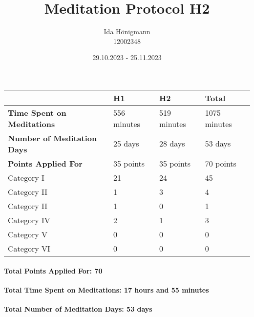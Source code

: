 \documentclass[11pt,a4paper]{article}
\begin{document}
\afterpage{\restorepagecolor}
\title{\LARGE\bfseries Meditation Protocol H2}
\author{Ida Hönigmann \\ 12002348}
\date{29.10.2023 - 25.11.2023}
\maketitle

\begin{tabular}{l|l|l|l}
	                                   & \textbf{H1} & \textbf{H2} & \textbf{Total}\\
	\hline
	\textbf{Time Spent on Meditations} & 556 minutes & 519 minutes & 1075 minutes  \\
	\textbf{Number of Meditation Days} & 25 days     & 28 days     & 53 days       \\
	\textbf{Points Applied For}        & 35 points   & 35 points   & 70 points     \\
	\hline
	Category I                         & 21          & 24          & 45            \\
	Category II                        & 1           & 3           & 4             \\
	Category II                        & 1           & 0           & 1             \\
	Category IV                        & 2           & 1           & 3             \\
	Category V                         & 0           & 0           & 0             \\
	Category VI                        & 0           & 0           & 0             \\
\end{tabular}

\paragraph{Total Points Applied For: 70}
\paragraph{Total Time Spent on Meditations: 17 hours and 55 minutes}
\paragraph{Total Number of Meditation Days: 53 days}

\end{document}

